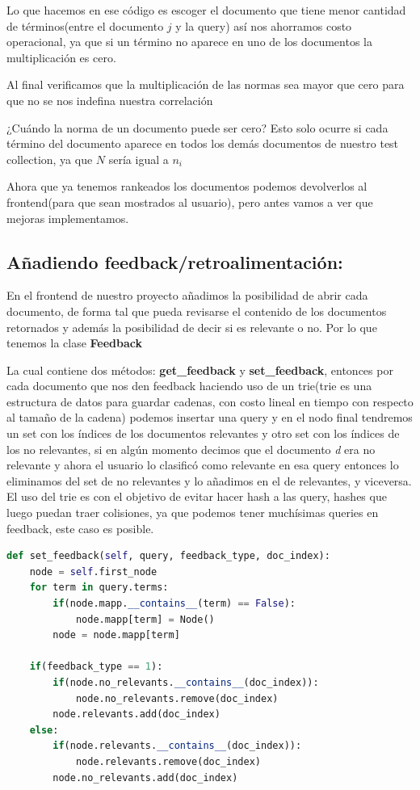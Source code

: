 \documentclass{llncs}
\begin{document}
Lo que hacemos en ese código es escoger el documento que tiene menor cantidad de términos(entre el documento $j$ y la query) así nos ahorramos costo operacional, ya que si un término no aparece en uno de los documentos la multiplicación es cero.


Al final verificamos que la multiplicación de las normas sea mayor que cero para que no se nos indefina nuestra correlación


¿Cuándo la norma de un documento puede ser cero?  
Esto solo ocurre si cada término del documento aparece en todos los demás documentos de nuestro test collection, ya que $N$ sería igual a $n_i$


Ahora que ya tenemos rankeados los documentos podemos devolverlos al frontend(para que sean mostrados al usuario), pero antes vamos a ver que mejoras implementamos.


\subsection{Añadiendo feedback/retroalimentación:}


En el frontend de nuestro proyecto añadimos la posibilidad de abrir cada documento, de forma tal que pueda revisarse el contenido de los documentos retornados y además la posibilidad de decir si es relevante o no. Por lo que tenemos la clase \textbf{Feedback}


La cual contiene dos métodos: \textbf{get\_feedback} y \textbf{set\_feedback}, entonces por cada documento que nos den feedback haciendo uso de un trie(trie es una estructura de datos para guardar cadenas, con costo lineal en tiempo con respecto al tamaño de la cadena) podemos insertar una query y en el nodo final tendremos un set con los índices de los documentos relevantes y otro set con los índices de los no relevantes, si en algún momento decimos que el documento \textit{d} era no relevante y ahora el usuario lo clasificó como relevante en esa query entonces lo eliminamos del set de no relevantes y lo añadimos en el de relevantes, y viceversa. El uso del trie es con el objetivo de evitar hacer hash a las query, hashes que luego puedan traer colisiones, ya que podemos tener muchísimas queries en feedback, este caso es posible.

\begin{lstlisting}[language=Python]
def set_feedback(self, query, feedback_type, doc_index):
    node = self.first_node
    for term in query.terms:
        if(node.mapp.__contains__(term) == False):
            node.mapp[term] = Node()
        node = node.mapp[term]

    if(feedback_type == 1):
        if(node.no_relevants.__contains__(doc_index)):
            node.no_relevants.remove(doc_index)
        node.relevants.add(doc_index)
    else:
        if(node.relevants.__contains__(doc_index)):
            node.relevants.remove(doc_index)
        node.no_relevants.add(doc_index)
\end{lstlisting}
\end{document}
